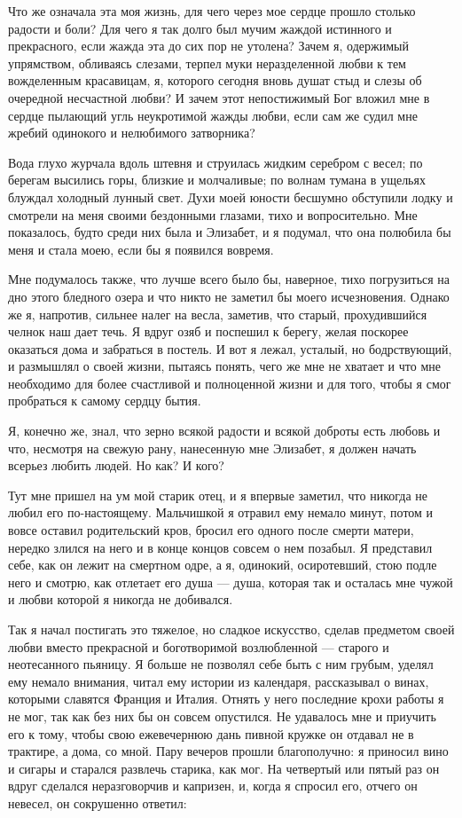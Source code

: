 Что  же означала  эта  моя жизнь,  для чего  через  мое сердце  прошло
столько  радости  и боли?  Для  чего  я  так  долго был  мучим  жаждой
истинного и прекрасного,  если жажда эта до сих пор  не утолена? Зачем
я, одержимый упрямством, обливаясь  слезами, терпел муки неразделенной
любви к  тем вожделенным красавицам,  я, которого сегодня  вновь душат
стыд и слезы об очередной  несчастной любви? И зачем этот непостижимый
Бог вложил  мне в сердце  пылающий угль неукротимой жажды  любви, если
сам же судил мне жребий одинокого и нелюбимого затворника?

Вода глухо журчала  вдоль штевня и струилась жидким  серебром с весел;
по берегам  высились горы,  близкие и молчаливые;  по волнам  тумана в
ущельях  блуждал  холодный  лунный  свет. Духи  моей  юности  бесшумно
обступили лодку и  смотрели на меня своими бездонными  глазами, тихо и
вопросительно. Мне  показалось, будто среди  них была и Элизабет,  и я
подумал, что  она полюбила бы  меня и стала  моею, если бы  я появился
вовремя.

Мне  подумалось  также,  что  лучше  всего  было  бы,  наверное,  тихо
погрузиться на  дно этого  бледного озера  и что  никто не  заметил бы
моего исчезновения.  Однако же  я, напротив,  сильнее налег  на весла,
заметив, что старый, прохудившийся челнок  наш дает течь. Я вдруг озяб
и  поспешил к  берегу, желая  поскорее  оказаться дома  и забраться  в
постель. И вот я лежал, усталый,  но бодрствующий, и размышлял о своей
жизни, пытаясь понять, чего же мне не хватает и что мне необходимо для
более  счастливой  и  полноценной  жизни  и для  того,  чтобы  я  смог
пробраться к самому сердцу бытия.

Я, конечно  же, знал, что зерно  всякой радости и всякой  доброты есть
любовь  и что,  несмотря на  свежую рану,  нанесенную мне  Элизабет, я
должен начать всерьез любить людей. Но как? И кого?

Тут мне пришел на ум мой старик отец, и я впервые заметил, что никогда
не любил  его по-настоящему.  Мальчишкой я  отравил ему  немало минут,
потом  и вовсе  оставил  родительский кров,  бросил  его одного  после
смерти матери,  нередко злился на него  и в конце концов  совсем о нем
позабыл.  Я представил  себе,  как он  лежит на  смертном  одре, а  я,
одинокий, осиротевший, стою подле него и смотрю, как отлетает его душа
--- душа, которая  так и осталась мне чужой и  любви которой я никогда
не добивался.

Так  я  начал постигать  это  тяжелое,  но сладкое  искусство,  сделав
предметом своей  любви вместо  прекрасной и  боготворимой возлюбленной
--- старого  и неотесанного  пьяницу. Я больше  не позволял  себе быть
с  ним  грубым, уделял  ему  немало  внимания,  читал ему  истории  из
календаря, рассказывал  о винах,  которыми славятся Франция  и Италия.
Отнять у него последние  крохи работы я не мог, так как  без них бы он
совсем опустился. Не  удавалось мне и приучить его к  тому, чтобы свою
ежевечернюю дань  пивной кружке он отдавал  не в трактире, а  дома, со
мной. Пару  вечеров прошли  благополучно: я приносил  вино и  сигары и
старался  развлечь старика,  как мог.  На четвертый  или пятый  раз он
вдруг  сделался неразговорчив  и  капризен, и,  когда  я спросил  его,
отчего он невесел, он сокрушенно ответил:

